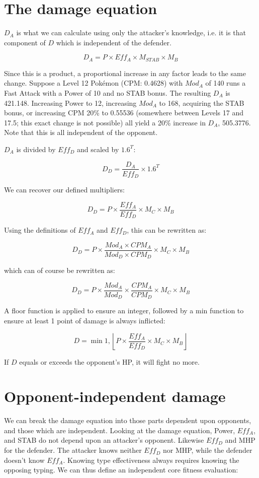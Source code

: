 \section{The damage equation\label{sec:damage}}

$D_A$ is what we can calculate using only the attacker's knowledge, i.e.
 it is that component of $D$ which is independent of the defender.

\[ D_A = P \times Eff_A \times M_{STAB} \times M_B \]

Since this is a product, a proportional increase in any factor leads to
 the same change.
Suppose a Level 12 Pokémon (CPM: 0.4628) with $Mod_A$ of 140 runs
  a Fast Attack with a Power of 10 and no STAB bonus.
The resulting $D_A$ is 421.148.
Increasing Power to 12,
 increasing $Mod_A$ to 168,
 acquiring the STAB bonus,
 or increasing CPM 20\% to 0.55536 (somewhere between Levels 17 and 17.5; this exact change is not possible)
 all yield a 20\% increase in $D_A$, 505.3776.
Note that this is all independent of the opponent.

$D_A$ is divided by $Eff_D$ and scaled by $1.6^T$:

\[ D_D = \frac{D_A}{Eff_D} \times 1.6^T \]

We can recover our defined multipliers:

\[ D_D = P \times \frac{Eff_A}{Eff_D} \times M_C \times M_B \]

Using the definitions of $Eff_A$ and $Eff_D$, this can be rewritten as:

\[ D_D = P \times \frac{Mod_A \times CPM_A}{Mod_D \times CPM_D} \times M_C \times M_B \]

which can of course be rewritten as:

\[ D_D = P \times \frac{Mod_A}{Mod_D} \times \frac{CPM_A}{CPM_D} \times M_C \times M_B \]

A floor function is applied to ensure an integer,
 followed by a min function to ensure at least 1 point of damage is always inflicted:

\[ D = \min{1, \left\lfloor P \times \frac{Eff_A}{Eff_D} \times M_C \times M_B \right\rfloor } \]

If $D$ equals or exceeds the opponent's HP, it will fight no more.

\section{Opponent-independent damage}
We can break the damage equation into those parts dependent
 upon opponents, and those which are independent.
Looking at the damage equation, Power, $Eff_A$, and STAB do not depend
 upon an attacker's opponent.
Likewise $Eff_D$ and MHP for the defender.
The attacker knows neither $Eff_D$ nor MHP, while the defender doesn't know $Eff_A$.
Knowing type effectiveness always requires knowing the opposing typing.
We can thus define an independent core fitness evaluation:

